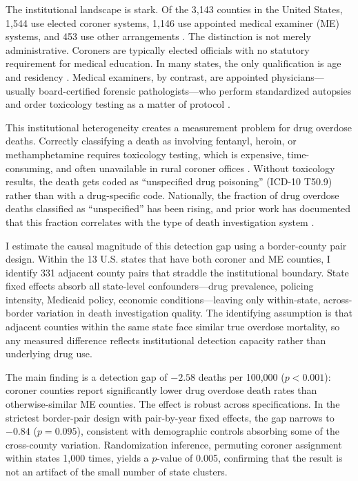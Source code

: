\documentclass[12pt]{article}
\begin{document}
The institutional landscape is stark. Of the 3,143 counties in the United States, 1,544 use elected coroner systems, 1,146 use appointed medical examiner (ME) systems, and 453 use other arrangements \citep{bjs_comec_2018}. The distinction is not merely administrative. Coroners are typically elected officials with no statutory requirement for medical education. In many states, the only qualification is age and residency \citep{hanzlick2006overview}. Medical examiners, by contrast, are appointed physicians---usually board-certified forensic pathologists---who perform standardized autopsies and order toxicology testing as a matter of protocol \citep{nrc2009strengthening}.

This institutional heterogeneity creates a measurement problem for drug overdose deaths. Correctly classifying a death as involving fentanyl, heroin, or methamphetamine requires toxicology testing, which is expensive, time-consuming, and often unavailable in rural coroner offices \citep{warner2013drugs}. Without toxicology results, the death gets coded as ``unspecified drug poisoning'' (ICD-10 T50.9) rather than with a drug-specific code. Nationally, the fraction of drug overdose deaths classified as ``unspecified'' has been rising, and prior work has documented that this fraction correlates with the type of death investigation system \citep{ruhm2017geographic, buchanich2018undercount}.

I estimate the causal magnitude of this detection gap using a border-county pair design. Within the 13 U.S. states that have both coroner and ME counties, I identify 331 adjacent county pairs that straddle the institutional boundary. State fixed effects absorb all state-level confounders---drug prevalence, policing intensity, Medicaid policy, economic conditions---leaving only within-state, across-border variation in death investigation quality. The identifying assumption is that adjacent counties within the same state face similar true overdose mortality, so any measured difference reflects institutional detection capacity rather than underlying drug use.

The main finding is a detection gap of $-2.58$ deaths per 100,000 ($p < 0.001$): coroner counties report significantly lower drug overdose death rates than otherwise-similar ME counties. The effect is robust across specifications. In the strictest border-pair design with pair-by-year fixed effects, the gap narrows to $-0.84$ ($p = 0.095$), consistent with demographic controls absorbing some of the cross-county variation. Randomization inference, permuting coroner assignment within states 1,000 times, yields a $p$-value of 0.005, confirming that the result is not an artifact of the small number of state clusters.
\end{document}
